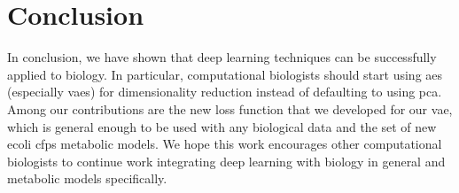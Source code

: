 \chapter{Conclusion}

In conclusion, we have shown that deep learning techniques can be successfully applied to biology.
In particular, computational biologists should start using \glspl{ae} (especially \glspl{vae}) for dimensionality reduction instead of defaulting to using \gls{pca}.
Among our contributions are the new loss function that we developed for our \gls{vae}, which is general enough to be used with any biological data and the set of new \gls{ecoli} \gls{cfps} metabolic models.
We hope this work encourages other computational biologists to continue work integrating deep learning with biology in general and metabolic models specifically.